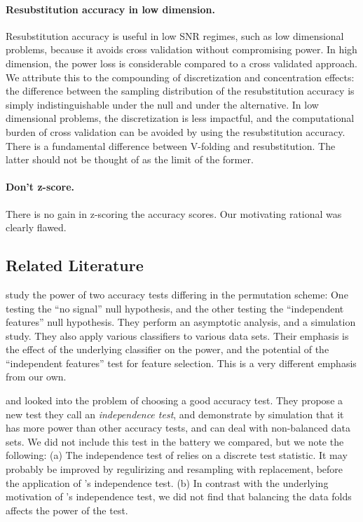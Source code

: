 \documentclass[12pt,a4paper]{article}
\begin{document}
\paragraph{Resubstitution accuracy in low dimension.} Resubstitution accuracy is useful in low SNR regimes, such as low dimensional problems, because it avoids cross validation without compromising power. 
In high dimension, the power loss is considerable compared to a cross validated approach. 
We attribute this to the compounding of discretization and concentration effects: the difference between the sampling distribution of the resubstitution accuracy is simply indistinguishable under the null and under the alternative. 
In low dimensional problems, the discretization is less impactful, and the computational burden of cross validation can be avoided by using the resubstitution accuracy. 
There is a fundamental difference between V-folding and resubstitution. The latter should not be thought of as the limit of the former. 
 

\paragraph{Don't z-score.} There is no gain in z-scoring the accuracy scores. Our motivating rational was clearly flawed. %

















\subsection{Related Literature}
\cite{ojala_permutation_2010} study the power of two accuracy tests differing in the permutation scheme:
One testing the ``no signal'' null hypothesis, and the other testing the ``independent features'' null hypothesis. 
They perform an asymptotic analysis, and a simulation study. 
They also apply various classifiers to various data sets. 
Their emphasis is the effect of the underlying classifier on the power, and the potential of the ``independent features'' test for feature selection.
This is a very different emphasis from our own.


\cite{olivetti_induction_2012} and \cite{olivetti_statistical_2014} looked into the problem of choosing a good accuracy test. 
They propose a new test they call an \emph{independence test}, and demonstrate by simulation that it has more power than other accuracy tests, and can deal with non-balanced data sets. 
We did not include this test in the battery we compared, but we note the following: 
(a) The independence test of \cite{olivetti_induction_2012} relies on a discrete test statistic. 
It may probably be improved by regulirizing and resampling with replacement, before the application of \cite{olivetti_induction_2012}'s independence test. 
(b) In contrast with the underlying motivation of \cite{olivetti_induction_2012}'s independence test, we did not find that balancing the data folds affects the power of the test. 
\end{document}
